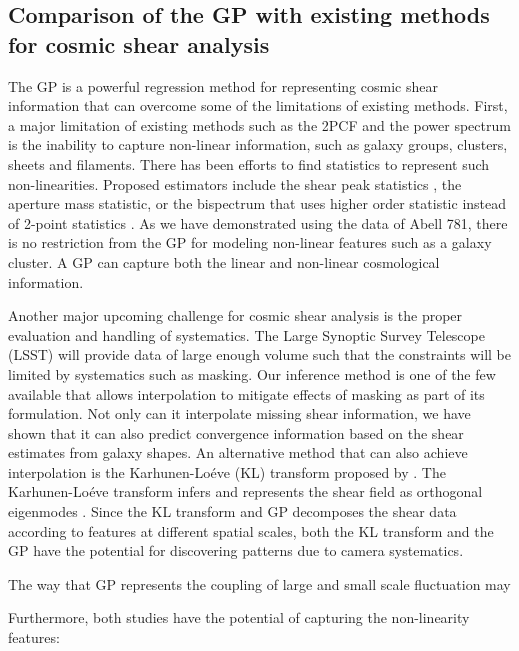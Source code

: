 \subsection{Comparison of the GP with existing methods for cosmic shear analysis}  
The GP is a powerful regression method for representing
cosmic shear information that can overcome some of the limitations of existing
methods. First, a major limitation of existing methods such as the 2PCF and the power
spectrum is the inability to capture non-linear information, 
such as galaxy groups, clusters, sheets and filaments.
There has been efforts to find statistics to represent such non-linearities.
Proposed estimators include the shear peak statistics 
\citep{Bard2014}, the aperture mass statistic, 
or the bispectrum that uses higher order statistic  
instead of 2-point statistics \citep{Kayo2012}.
As we have demonstrated using the data of Abell 781, 
there is no restriction from the
GP for modeling non-linear features such as a galaxy cluster. 
A GP can capture both the linear and non-linear cosmological information. 

Another major upcoming challenge for cosmic shear analysis is the proper
evaluation and handling of systematics. 
The Large Synoptic Survey Telescope (LSST) will
provide data of large enough volume such that the
constraints will be limited by systematics such as masking. 
Our inference method is one of the few available that allows interpolation 
to mitigate effects of masking as part of its formulation. Not only can it interpolate
missing shear information, we have shown that it can also predict convergence
information based on the shear estimates from galaxy shapes.
An alternative method that can also achieve interpolation 
is the Karhunen-Lo\'{e}ve (KL) transform proposed by \cite{VanderPlas2012a}. 
The Karhunen-Lo\'{e}ve transform infers and represents the shear field as 
orthogonal eigenmodes \citep{VanderPlas2012a}. 
Since the KL transform and GP decomposes the shear data according to features
at different spatial scales, both the KL transform and the GP have the potential 
for discovering patterns due to camera systematics.  

The way that GP represents the coupling of large and small scale fluctuation 
may 

Furthermore, both studies have the potential of capturing the non-linearity 
features:


